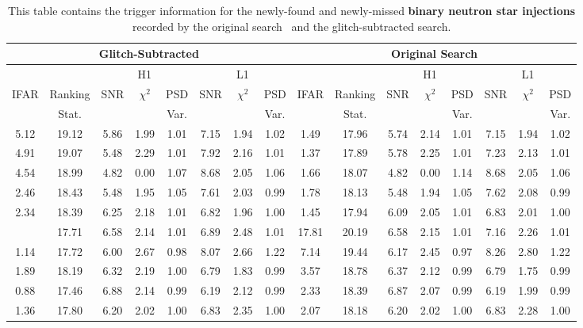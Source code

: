 \begin{landscape}
\begin{table}[tb]
\centering
\caption{\label{4:tab:apdx_changed_snr_bns}This table contains the trigger information for the newly-found and newly-missed \textbf{binary neutron star injections} recorded by the original search~\cite{gwtc3:2023} and the glitch-subtracted search.} 
\begin{tabular}{|c|c|c|c|c|c|c|c||c|c|c|c|c|c|c|c|}
\hline
\multicolumn{8}{|c||}{Glitch-Subtracted} & \multicolumn{8}{c|}{Original Search} \\
\hline
\multicolumn{2}{|c|}{} & \multicolumn{3}{c|}{H1} & \multicolumn{3}{c||}{L1} & \multicolumn{2}{c|}{} & \multicolumn{3}{c|}{H1} & \multicolumn{3}{c|}{L1}\\
\hline
IFAR & Ranking & SNR & $\chi^{2}$ & PSD & SNR & $\chi^{2}$ & PSD & IFAR & Ranking & SNR & $\chi^{2}$ & PSD & SNR & $\chi^{2}$ & PSD \\ &
Stat. & & & Var. & & & Var. & & Stat. & & & Var. & & & Var.\\
\hline
5.12 & 19.12 & 5.86 & 1.99 & 1.01 & 7.15 & 1.94 & 1.02 & 1.49 & 17.96 & 5.74 & 2.14 & 1.01 & 7.15 & 1.94 & 1.02 \\
4.91 & 19.07 & 5.48 & 2.29 & 1.01 & 7.92 & 2.16 & 1.01 & 1.37 & 17.89 & 5.78 & 2.25 & 1.01 & 7.23 & 2.13 & 1.01 \\
4.54 & 18.99 & 4.82 & 0.00 & 1.07 & 8.68 & 2.05 & 1.06 & 1.66 & 18.07 & 4.82 & 0.00 & 1.14 & 8.68 & 2.05 & 1.06 \\
2.46 & 18.43 & 5.48 & 1.95 & 1.05 & 7.61 & 2.03 & 0.99 & 1.78 & 18.13 & 5.48 & 1.94 & 1.05 & 7.62 & 2.08 & 0.99 \\
2.34 & 18.39 & 6.25 & 2.18 & 1.01 & 6.82 & 1.96 & 1.00 & 1.45 & 17.94 & 6.09 & 2.05 & 1.01 & 6.83 & 2.01 & 1.00 \\
\hdashline
1.24 & 17.71 & 6.58 & 2.14 & 1.01 & 6.89 & 2.48 & 1.01 & 17.81 & 20.19 & 6.58 & 2.15 & 1.01 & 7.16 & 2.26 & 1.01 \\
1.14 & 17.72 & 6.00 & 2.67 & 0.98 & 8.07 & 2.66 & 1.22 & 7.14 & 19.44 & 6.17 & 2.45 & 0.97 & 8.26 & 2.80 & 1.22 \\
1.89 & 18.19 & 6.32 & 2.19 & 1.00 & 6.79 & 1.83 & 0.99 & 3.57 & 18.78 & 6.37 & 2.12 & 0.99 & 6.79 & 1.75 & 0.99 \\
0.88 & 17.46 & 6.88 & 2.14 & 0.99 & 6.19 & 2.12 & 0.99 & 2.33 & 18.39 & 6.87 & 2.07 & 0.99 & 6.19 & 1.99 & 0.99 \\
1.36 & 17.80 & 6.20 & 2.02 & 1.00 & 6.83 & 2.35 & 1.00 & 2.07 & 18.18 & 6.20 & 2.02 & 1.00 & 6.83 & 2.28 & 1.00 \\
\hline
\end{tabular}
\end{table}
\end{landscape}
\restoregeometry %

